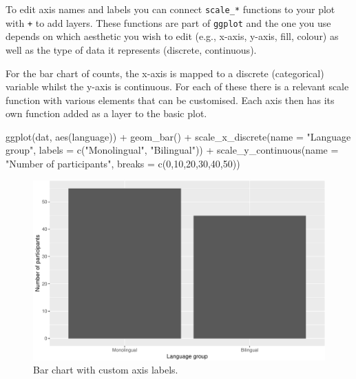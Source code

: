 \documentclass[
  english,
  doc,floatsintext]{apa6}
\newenvironment{Shaded}{\begin{snugshade}}{\end{snugshade}}
\newcommand{\AttributeTok}[1]{\textcolor[rgb]{0.77,0.63,0.00}{#1}}
\newcommand{\DecValTok}[1]{\textcolor[rgb]{0.00,0.00,0.81}{#1}}
\newcommand{\FunctionTok}[1]{\textcolor[rgb]{0.00,0.00,0.00}{#1}}
\newcommand{\NormalTok}[1]{#1}
\newcommand{\SpecialCharTok}[1]{\textcolor[rgb]{0.00,0.00,0.00}{#1}}
\newcommand{\StringTok}[1]{\textcolor[rgb]{0.31,0.60,0.02}{#1}}
\begin{document}
To edit axis names and labels you can connect \texttt{scale\_*} functions to your plot with \texttt{+} to add layers. These functions are part of \texttt{ggplot} and the one you use depends on which aesthetic you wish to edit (e.g., x-axis, y-axis, fill, colour) as well as the type of data it represents (discrete, continuous).

For the bar chart of counts, the x-axis is mapped to a discrete (categorical) variable whilst the y-axis is continuous. For each of these there is a relevant scale function with various elements that can be customised. Each axis then has its own function added as a layer to the basic plot.

\begin{Shaded}
\begin{Highlighting}[]
\FunctionTok{ggplot}\NormalTok{(dat, }\FunctionTok{aes}\NormalTok{(language)) }\SpecialCharTok{+}
  \FunctionTok{geom\_bar}\NormalTok{() }\SpecialCharTok{+}
  \FunctionTok{scale\_x\_discrete}\NormalTok{(}\AttributeTok{name =} \StringTok{"Language group"}\NormalTok{, }
                   \AttributeTok{labels =} \FunctionTok{c}\NormalTok{(}\StringTok{"Monolingual"}\NormalTok{, }\StringTok{"Bilingual"}\NormalTok{)) }\SpecialCharTok{+}
  \FunctionTok{scale\_y\_continuous}\NormalTok{(}\AttributeTok{name =} \StringTok{"Number of participants"}\NormalTok{,}
                     \AttributeTok{breaks =} \FunctionTok{c}\NormalTok{(}\DecValTok{0}\NormalTok{,}\DecValTok{10}\NormalTok{,}\DecValTok{20}\NormalTok{,}\DecValTok{30}\NormalTok{,}\DecValTok{40}\NormalTok{,}\DecValTok{50}\NormalTok{))}
\end{Highlighting}
\end{Shaded}

\begin{figure}

{\centering \includegraphics[width=1\linewidth]{images/bar3-1} 

}

\caption{Bar chart with custom axis labels.}\label{fig:bar3}
\end{figure}
\end{document}

